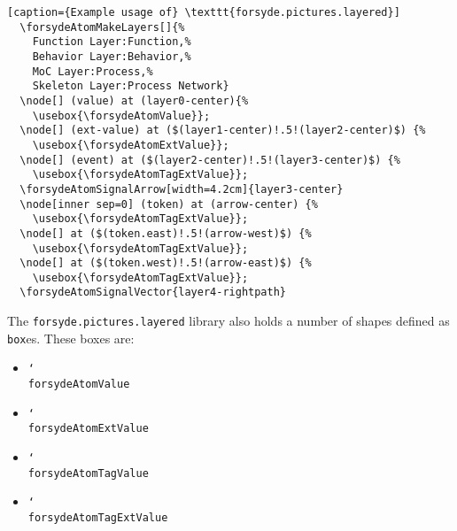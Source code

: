 \begin{lstlisting}[caption={Example usage of} \texttt{forsyde.pictures.layered}]
  \forsydeAtomMakeLayers[]{%
    Function Layer:Function,%
    Behavior Layer:Behavior,%
    MoC Layer:Process,%
    Skeleton Layer:Process Network}
  \node[] (value) at (layer0-center){%
    \usebox{\forsydeAtomValue}};
  \node[] (ext-value) at ($(layer1-center)!.5!(layer2-center)$) {%
    \usebox{\forsydeAtomExtValue}};
  \node[] (event) at ($(layer2-center)!.5!(layer3-center)$) {%
    \usebox{\forsydeAtomTagExtValue}};
  \forsydeAtomSignalArrow[width=4.2cm]{layer3-center}
  \node[inner sep=0] (token) at (arrow-center) {%
    \usebox{\forsydeAtomTagExtValue}};
  \node[] at ($(token.east)!.5!(arrow-west)$) {%
    \usebox{\forsydeAtomTagExtValue}};
  \node[] at ($(token.west)!.5!(arrow-east)$) {%
    \usebox{\forsydeAtomTagExtValue}};
  \forsydeAtomSignalVector{layer4-rightpath}
\end{lstlisting}


The  \texttt{forsyde.pictures.layered} library also holds a number of shapes defined as \texttt{box}es. These boxes are:

\begin{itemize}
\item \texttt{\char`\\forsydeAtomValue}
\item \texttt{\char`\\forsydeAtomExtValue}
\item \texttt{\char`\\forsydeAtomTagValue}
\item \texttt{\char`\\forsydeAtomTagExtValue}
\end{itemize}


